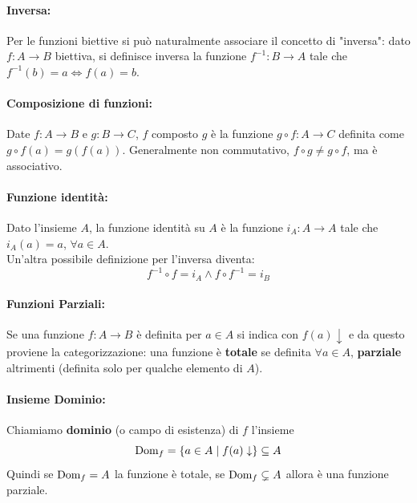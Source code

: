 \paragraph{Inversa:} Per le funzioni biettive si può naturalmente associare il concetto di "inversa": dato $f: A \rightarrow B$ biettiva, si definisce inversa la funzione $f^{-1}: B \rightarrow A$ tale che $f^{-1} (b) = a \Leftrightarrow f(a) = b$.\\

\paragraph{Composizione di funzioni:} Date $f: A \rightarrow B$ e $g: B \rightarrow C$, $f$ composto $g$ è la funzione $g \circ f: A \rightarrow C$ definita come $g \circ f(a) = g(f(a))$. Generalmente non commutativo, $f \circ g \neq g \circ f$, ma è associativo.\\

\paragraph{Funzione identità:} Dato l'insieme $A$, la funzione identità su $A$ è la funzione $i_A: A \rightarrow A$ tale che $i_A (a) = a$, $\forall a \in A$.\\

Un'altra possibile definizione per l'inversa diventa:
$$ f^{-1} \circ f = i_A \wedge f \circ f^{-1} = i_B $$

\paragraph{Funzioni Parziali:} Se una funzione $f: A \rightarrow B$ è definita per $a \in A$ si indica con $f(a) \downarrow$ e da questo proviene la categorizzazione: una funzione è \textbf{totale} se definita $\forall a \in A$, \textbf{parziale} altrimenti (definita solo per qualche elemento di $A$).\\

\paragraph{Insieme Dominio:} Chiamiamo \textbf{dominio} (o campo di esistenza) di $f$ l'insieme
$$ \text{Dom}_f = \left\{a \in A \mid f(a) \downarrow \right\} \subseteq A $$
Quindi se $\text{Dom}_f = A$ la funzione è totale, se $\text{Dom}_f \subsetneq A$ allora è una funzione parziale.\\

